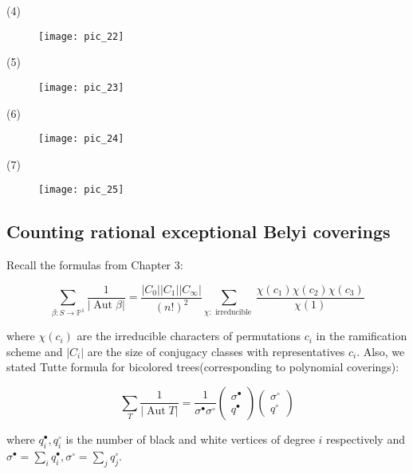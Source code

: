\newpage
(4)
\begin{figure}[!htb]
\texttt{[image: pic\_22]}
\end{figure}

(5)
\begin{figure}[!htb]
\texttt{[image: pic\_23]}
\end{figure}

(6)
\begin{figure}[!htb]
\texttt{[image: pic\_24]}
\end{figure}

(7)
\begin{figure}[!htb]
\texttt{[image: pic\_25]}
\end{figure}

\newpage
\subsection{Counting rational exceptional Belyi coverings}

Recall the formulas from Chapter 3:


\begin{equation*}
\sum_{\beta: S \rightarrow \mathbb{P}^{1}} \frac{1}{|\operatorname{Aut} \beta|}=\frac{\left|C_{0}\right|\left|C_{1}\right|\left|C_{\infty}\right|}{(n !)^{2}} \sum_{\chi: \text { irreducible }} \frac{\chi\left(c_{1}\right) \chi\left(c_{2}\right) \chi\left(c_{3}\right)}{\chi(1)} \tag{5.1}
\end{equation*}


where $\chi\left(c_{i}\right)$ are the irreducible characters of permutations $c_{i}$ in the ramification scheme and $\left|C_{i}\right|$ are the size of conjugacy classes with representatives $c_{i}$. Also, we stated Tutte formula for bicolored trees(corresponding to polynomial coverings):


$$
\sum_{T} \frac{1}{|\operatorname{Aut} T|}=\frac{1}{\sigma^{\bullet} \sigma^{\circ}}\left(\begin{array}{l}
\sigma^{\bullet}  \\
q^{\bullet}
\end{array}\right)\left(\begin{array}{l}
\sigma^{\circ} \\
q^{\circ}
\end{array}\right)
$$


where $q_{i}^{\bullet}, q_{i}^{\circ}$ is the number of black and white vertices of degree $i$ respectively and $\sigma^{\bullet}=\sum_{i} q_{i}^{\bullet}, \sigma^{\circ}=\sum_{j} q_{j}^{\circ}$. \\

